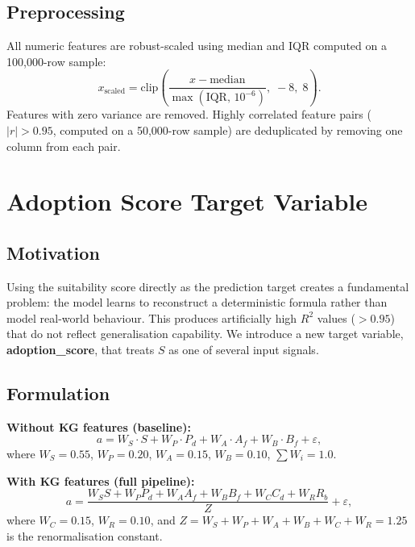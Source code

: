 \documentclass[10pt,journal,compsoc]{IEEEtran}
\begin{document}
\subsection{Preprocessing}

All numeric features are robust-scaled using median and IQR computed on a
100{,}000-row sample:
\begin{equation}
  x_{\text{scaled}} = \mathrm{clip}\!\left(
    \frac{x-\text{median}}{\max(\text{IQR},\,10^{-6})},\;-8,\;8\right).
  \label{eq:robust_scale}
\end{equation}
Features with zero variance are removed.
Highly correlated feature pairs ($|r|>0.95$, computed on a 50{,}000-row sample) are
deduplicated by removing one column from each pair.

\section{Adoption Score Target Variable}
\label{sec:target}

\subsection{Motivation}

Using the suitability score directly as the prediction target creates a fundamental
problem: the model learns to reconstruct a deterministic formula rather than model
real-world behaviour.
This produces artificially high $R^2$ values ($>0.95$) that do not reflect
generalisation capability.
We introduce a new target variable, \textbf{adoption\_score}, that treats $S$ as one
of several input signals.

\subsection{Formulation}

\textbf{Without KG features (baseline):}
\begin{equation}
  a = W_S\cdot S + W_P\cdot P_d + W_A\cdot A_f + W_B\cdot B_f + \varepsilon,
  \label{eq:adopt_base}
\end{equation}
where $W_S{=}0.55$, $W_P{=}0.20$, $W_A{=}0.15$, $W_B{=}0.10$, $\sum W_i=1.0$.

\textbf{With KG features (full pipeline):}
\begin{equation}
  a = \frac{W_S S + W_P P_d + W_A A_f + W_B B_f + W_C C_d + W_R R_b}{Z} + \varepsilon,
  \label{eq:adopt_kg}
\end{equation}
where $W_C{=}0.15$, $W_R{=}0.10$, and
$Z=W_S+W_P+W_A+W_B+W_C+W_R=1.25$ is the renormalisation constant.
\end{document}
